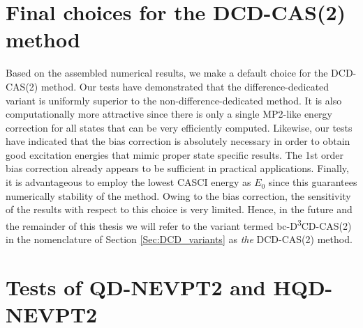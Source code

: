 \section{Final choices for the DCD-CAS(2) method}
Based on the assembled numerical results, we make a default choice for the DCD-CAS(2) method. Our tests have demonstrated that the difference-dedicated variant is uniformly superior to the non-difference-dedicated method. It is also computationally more attractive since there is only a single MP2-like energy correction for all states that can be very efficiently computed. Likewise, our tests have indicated that the bias correction is absolutely necessary in order to obtain good excitation energies that mimic proper state specific results. The 1st order bias correction already appears to be sufficient in practical applications. Finally, it is advantageous to employ the lowest CASCI energy as $E_0$ since this guarantees numerically stability of the method. Owing to the bias correction, the sensitivity of the results with respect to this choice is very limited. Hence, in the future and the remainder of this thesis we will refer to the variant termed bc-D\textsuperscript{3}CD-CAS(2) in the nomenclature of Section \ref{Sec:DCD_variants} as \emph{the} DCD-CAS(2) method.

\section{Tests of QD-NEVPT2 and HQD-NEVPT2}
